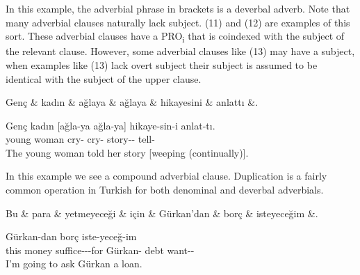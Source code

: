 \documentclass[11pt,a4paper]{article}
\begin{document}
In this example, the adverbial phrase in brackets is a deverbal adverb. Note that many adverbial clauses naturally lack subject. (11) and (12) are examples of this sort. These adverbial clauses have a PRO\textsubscript{i} that is coindexed with the subject of the relevant clause. However, some adverbial clauses like (13) may have a subject, when examples like (13) lack overt subject their subject is assumed to be identical with the subject of the upper clause.

\begin{exe}
\ex \label{advcl}
\begin{dependency}
\begin{deptext}[column sep=0.3cm]
Genç \& kadın \& ağlaya \& ağlaya \& hikayesini \& anlattı \&. \\
\end{deptext}
\end{dependency}
\gll Genç kadın [ağla-ya ağla-ya] hikaye-sin-i anlat-tı.  \\
young woman cry-\Adv{} cry-\Adv{} story-\Tsg{}-\Acc{} tell-\Pst{} \\
\glt The young woman told her story [weeping (continually)].
\end{exe}

In this example we see a compound adverbial clause. Duplication is a fairly common operation in Turkish for both denominal and deverbal adverbials.

\begin{exe}
\ex \label{advcl}
\begin{dependency}
\begin{deptext}[column sep=0.32cm]
Bu \& para \& yetmeyeceği \& için \& Gürkan'dan \& borç \& isteyeceğim \&. \\
\end{deptext}
\end{dependency}
 Gürkan-dan borç iste-yeceğ-im  \\
this money suffice-\Neg{}-\Ptcp{}-\Tsg for Gürkan-\Abl{} debt want-\Fut{}-\Fsg{} \\
 I’m going to ask Gürkan a loan.
\end{exe}
\end{document}

